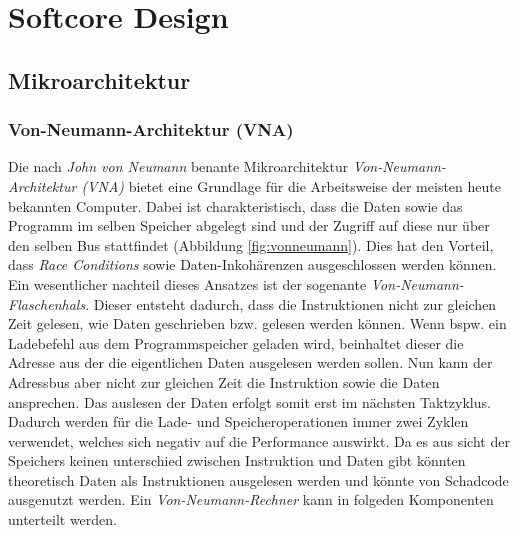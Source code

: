     \section{Softcore Design}

        \subsection{Mikroarchitektur}
                \subsubsection{Von-Neumann-Architektur (VNA)}
                    Die nach \textit{John von Neumann} benante Mikroarchitektur \textit{Von-Neumann-Architektur (VNA)}
                    bietet eine Grundlage für die Arbeitsweise der meisten heute bekannten Computer.
                    Dabei ist charakteristisch, dass die Daten sowie das Programm im selben Speicher abgelegt sind und
                    der Zugriff auf diese nur über den selben Bus stattfindet (Abbildung \ref{fig:vonneumann}).
                    Dies hat den Vorteil, dass \textit{Race Conditions} sowie Daten-Inkohärenzen ausgeschlossen werden können.
                    Ein wesentlicher nachteil dieses Ansatzes ist der sogenante \textit{Von-Neumann-Flaschenhals}.
                    Dieser entsteht dadurch, dass die Instruktionen nicht zur gleichen Zeit gelesen,
                    wie Daten geschrieben bzw. gelesen werden können. Wenn bspw. ein Ladebefehl aus dem Programmspeicher
                    geladen wird, beinhaltet dieser die Adresse aus der die eigentlichen Daten ausgelesen werden sollen.
                    Nun kann der Adressbus aber nicht zur gleichen Zeit die Instruktion sowie die Daten ansprechen.
                    Das auslesen der Daten erfolgt somit erst im nächsten Taktzyklus. Dadurch werden für
                    die Lade- und Speicheroperationen immer zwei Zyklen verwendet, welches sich
                    negativ auf die Performance auswirkt.
                    Da es aus sicht der Speichers keinen unterschied zwischen Instruktion und Daten gibt
                    könnten theoretisch Daten als Instruktionen ausgelesen werden und könnte von Schadcode ausgenutzt werden.
                    Ein \textit{Von-Neumann-Rechner} kann in folgeden Komponenten unterteilt werden.

